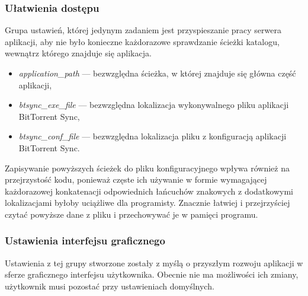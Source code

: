 \subsubsection*{Ułatwienia dostępu}

Grupa ustawień, której jedynym zadaniem jest przyspieszanie pracy serwera aplikacji, aby nie było konieczne każdorazowe sprawdzanie ścieżki katalogu, wewnątrz którego znajduje się aplikacja.

\begin{itemize}[noitemsep]
  \item \emph{application\_path} --- bezwzględna ścieżka, w której znajduje się główna część aplikacji,
  \item \emph{btsync\_exe\_file} --- bezwzględna lokalizacja wykonywalnego pliku aplikacji BitTorrent Sync,
  \item \emph{btsync\_conf\_file} --- bezwzględna lokalizacja pliku z konfiguracją aplikacji BitTorrent Sync.
\end{itemize}

Zapisywanie powyższych ścieżek do pliku konfiguracyjnego wpływa również na przejrzystość kodu, ponieważ częste ich używanie w formie wymagającej każdorazowej konkatenacji odpowiednich łańcuchów znakowych z dodatkowymi lokalizacjami byłoby uciążliwe dla programisty. Znacznie łatwiej i przejrzyściej czytać powyższe dane z pliku i przechowywać je w pamięci programu.

\subsubsection*{Ustawienia interfejsu graficznego}

Ustawienia z tej grupy stworzone zostały z myślą o przyszłym rozwoju aplikacji w sferze graficznego interfejsu użytkownika. Obecnie nie ma możliwości ich zmiany, użytkownik musi pozostać przy ustawieniach domyślnych.

